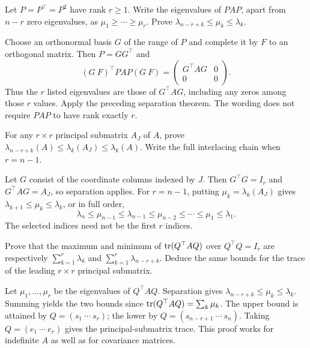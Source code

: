 \begin{problem}
Let $P=P^\top=P^2$ have rank $r\geqslant1$. Write the eigenvalues of
$PAP$, apart from $n-r$ zero eigenvalues, as
$\mu_1\geqslant\cdots\geqslant\mu_r$. Prove
$\lambda_{n-r+k}\leqslant\mu_k\leqslant\lambda_k$.
\end{problem}
\begin{solution}
Choose an orthonormal basis $G$ of the range of $P$ and complete it by
$F$ to an orthogonal matrix. Then $P=GG^\top$ and
\[
(G\ F)^\top PAP(G\ F)
=\begin{pmatrix}G^\top AG&0\\0&0\end{pmatrix}.
\]
Thus the $r$ listed eigenvalues are those of $G^\top AG$, including
any zeros among those $r$ values. Apply the preceding separation theorem.
The wording does not require $PAP$ to have rank exactly $r$.
\end{solution}

\begin{problem}
For any $r\times r$ principal submatrix $A_J$ of $A$, prove
$\lambda_{n-r+k}(A)\leqslant\lambda_k(A_J)\leqslant\lambda_k(A)$.
Write the full interlacing chain when $r=n-1$.
\end{problem}
\begin{solution}
Let $G$ consist of the coordinate columns indexed by $J$.
Then $G^\top G=I_r$ and $G^\top AG=A_J$, so separation applies.
For $r=n-1$, putting $\mu_k=\lambda_k(A_J)$ gives
$\lambda_{k+1}\leqslant\mu_k\leqslant\lambda_k$, or in full order,
\[
\lambda_n\leqslant\mu_{n-1}\leqslant\lambda_{n-1}
\leqslant\mu_{n-2}\leqslant\cdots\leqslant\mu_1\leqslant\lambda_1.
\]
The selected indices need not be the first $r$ indices.
\end{solution}

\begin{problem}\label{ex:12:trace}
Prove that the maximum and minimum of $\operatorname{tr}(Q^\top AQ)$ over
$Q^\top Q=I_r$ are respectively $\sum_{k=1}^r\lambda_k$ and
$\sum_{k=1}^r\lambda_{n-r+k}$. Deduce the same bounds for the trace
of the leading $r\times r$ principal submatrix.
\end{problem}
\begin{solution}
Let $\mu_1,\ldots,\mu_r$ be the eigenvalues of $Q^\top AQ$.
Separation gives $\lambda_{n-r+k}\leqslant\mu_k\leqslant\lambda_k$.
Summing yields the two bounds since $\operatorname{tr}(Q^\top AQ)=\sum_k\mu_k$.
The upper bound is attained by $Q=(s_1\ \cdots\ s_r)$; the lower by
$Q=(s_{n-r+1}\ \cdots\ s_n)$.
Taking $Q=(e_1\ \cdots\ e_r)$ gives the principal-submatrix trace.
This proof works for indefinite $A$ as well as for covariance matrices.
\end{solution}

